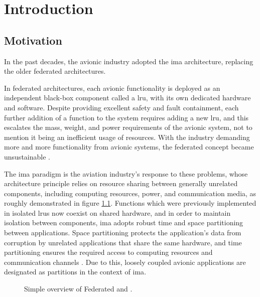 \documentclass[main.tex]{subfiles}
\begin{document}
\chapter{Introduction}

\section{Motivation}

In the past decades, the avionic industry adopted the \gls{ima} architecture, replacing the older federated architectures.

In federated architectures, each avionic functionality is deployed as an independent black-box component called a \gls{lru}, with its own dedicated hardware and software.
Despite providing excellent safety and fault containment, each further addition of a function to the system requires adding a new \gls{lru}, and this escalates the mass, weight, and power requirements of the avionic system, not to mention it being an inefficient usage of resources.
With the industry demanding more and more functionality from avionic systems, the federated concept became unsustainable \cite{mairaj2015preferred}.

The \gls{ima} paradigm is the aviation industry's response to these problems, whose architecture principle relies on resource sharing between generally unrelated components, including computing resources, power, and communication media, as roughly demonstrated in figure \ref{fig:ima-federated}.
Functions which were previously implemented in isolated \glspl{lru} now coexist on shared hardware, and in order to maintain isolation between components, \gls{ima} adopts robust time and space partitioning between applications.
Space partitioning protects the application's data from corruption by unrelated applications that share the same hardware, and time partitioning ensures the required access to computing resources and communication channels \cite{ananda2013arinc}.
Due to this, loosely coupled avionic applications are designated as partitions in the context of \gls{ima}.

\begin{figure}
    \centering
    \resizebox{!}{8cm}{}
    \caption{Simple overview of Federated and .}
    \label{fig:ima-federated}
\end{figure}
\end{document}
